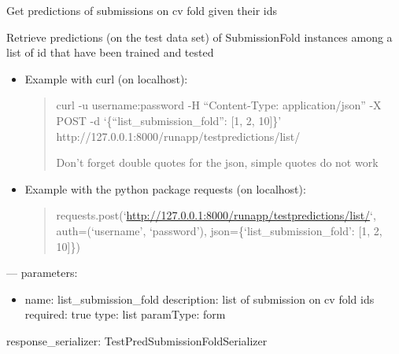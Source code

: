 \documentclass[letterpaper,10pt,english]{sphinxmanual}
\begin{document}
\begin{fulllineitems}
\label{modules/views:runapp.views.GetTestPredictionList}
Get predictions of submissions on cv fold given their ids

\begin{fulllineitems}
\label{modules/views:runapp.views.GetTestPredictionList.post}
Retrieve predictions (on the test data set) of SubmissionFold instances        among a list of id that have been trained and tested
\begin{itemize}
\item {} 
Example with curl (on localhost):
\begin{quote}

curl -u username:password -H ``Content-Type: application/json''            -X POST            -d `\{``list\_submission\_fold'': {[}1, 2, 10{]}\}'                http://127.0.0.1:8000/runapp/testpredictions/list/

Don't forget double quotes for the json, simple quotes do not work
\end{quote}

\item {} 
Example with the python package requests (on localhost):
\begin{quote}

requests.post(`\url{http://127.0.0.1:8000/runapp/testpredictions/list/}`,                          auth=(`username', `password'),                          json=\{`list\_submission\_fold': {[}1, 2, 10{]}\})
\end{quote}

\end{itemize}

---
parameters:
\begin{itemize}
\item {} 
name: list\_submission\_fold
description: list of submission on cv fold ids
required: true
type: list
paramType: form

\end{itemize}

response\_serializer: TestPredSubmissionFoldSerializer

\end{fulllineitems}


\end{fulllineitems}
\end{document}
